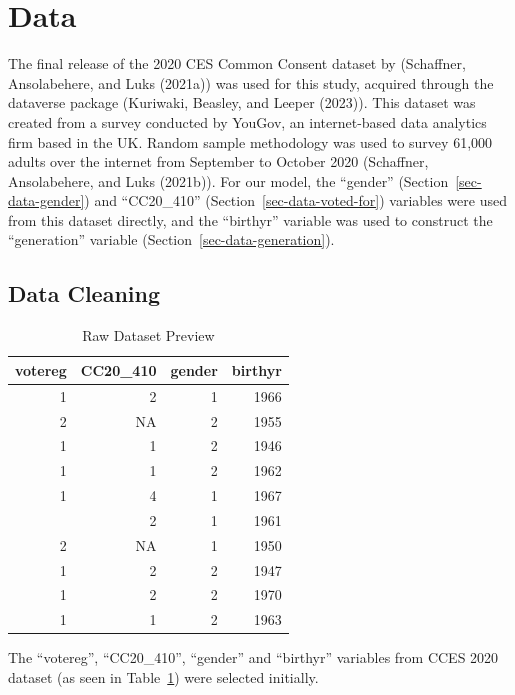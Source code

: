 \documentclass[
  letterpaper,
  DIV=11,
  numbers=noendperiod]{scrartcl}
\begin{document}
\hypertarget{sec-data}{%
\section{Data}\label{sec-data}}

The final release of the 2020 CES Common Consent dataset by (Schaffner,
Ansolabehere, and Luks (2021a)) was used for this study, acquired
through the dataverse package (Kuriwaki, Beasley, and Leeper (2023)).
This dataset was created from a survey conducted by YouGov, an
internet-based data analytics firm based in the UK. Random sample
methodology was used to survey 61,000 adults over the internet from
September to October 2020 (Schaffner, Ansolabehere, and Luks (2021b)).
For our model, the ``gender'' (Section~\ref{sec-data-gender}) and
``CC20\_410'' (Section~\ref{sec-data-voted-for}) variables were used
from this dataset directly, and the ``birthyr'' variable was used to
construct the ``generation'' variable
(Section~\ref{sec-data-generation}).

\hypertarget{sec-data-cleaning}{%
\subsection{Data Cleaning}\label{sec-data-cleaning}}

\hypertarget{tbl-raw-data-preview}{}
\begin{table}
\caption{\label{tbl-raw-data-preview}Raw Dataset Preview }\tabularnewline

\centering
\begin{tabular}{rrrr}
\toprule
votereg & CC20\_410 & gender & birthyr\\
\midrule
1 & 2 & 1 & 1966\\
2 & NA & 2 & 1955\\
1 & 1 & 2 & 1946\\
1 & 1 & 2 & 1962\\
1 & 4 & 1 & 1967\\
\addlinespace
1 & 2 & 1 & 1961\\
2 & NA & 1 & 1950\\
1 & 2 & 2 & 1947\\
1 & 2 & 2 & 1970\\
1 & 1 & 2 & 1963\\
\bottomrule
\end{tabular}
\end{table}

The ``votereg'', ``CC20\_410'', ``gender'' and ``birthyr'' variables
from CCES 2020 dataset (as seen in Table~\ref{tbl-raw-data-preview})
were selected initially.
\end{document}
